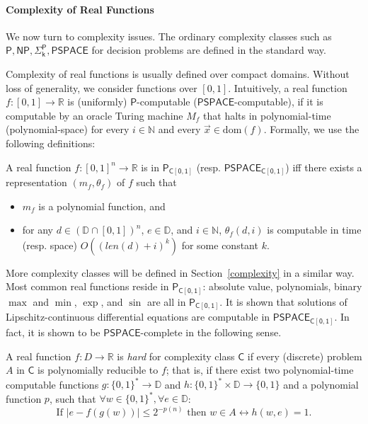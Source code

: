 \documentclass[prodmode]{acmsmall} %
\newcommand{\dom}{\mathrm{dom}}
\begin{document}
\paragraph{Complexity of Real Functions} We now turn to complexity issues. The ordinary complexity classes such as $\mathsf{P, NP, \Sigma_k^P, PSPACE}$ for decision problems are defined in the standard way. 

Complexity of real functions is usually defined over compact domains. Without loss of generality, we consider functions over $[0,1]$. Intuitively, a real function $f:[0,1]\rightarrow\mathbb{R}$ is (uniformly) $\mathsf{P}$-computable ($\mathsf{PSPACE}$-computable), if it is computable by an oracle Turing machine $M_{f}$ that halts in polynomial-time (polynomial-space) for every $i\in \mathbb{N}$ and every $\vec x\in \dom(f)$. Formally, we use the following definitions:
\begin{definition}
A real function $f: [0,1]^n\rightarrow \mathbb{R}$ is in $\mathsf{P_{C[0,1]}}$ (resp. $\mathsf{PSPACE_{C[0,1]}}$) iff there exists a representation $(m_f, \theta_f)$ of $f$ such that
\begin{itemize}
\item $m_f$ is a polynomial function, and 
\item for any $d\in (\mathbb{D}\cap [0,1])^n$, $e\in \mathbb{D}$, and $i\in \mathbb{N}$, $\theta_f(d,i)$ is computable in time (resp. space) $O((\mathit{len}(d)+i)^k)$ for some constant $k$.
\end{itemize}
\end{definition}
More complexity classes will be defined in Section~\ref{complexity} in a similar way. Most common real functions reside in $\mathsf{P_{C[0,1]}}$: absolute value, polynomials, binary $\max$ and $\min$, $\exp$, and $\sin$ are all in $\mathsf{P_{C[0,1]}}$. It is shown that solutions of Lipschitz-continuous differential equations are computable in $\mathsf{PSPACE_{C[0,1]}}$. In fact, it is shown to be $\mathsf{PSPACE}$-complete in the following sense. 
\begin{definition}
A real function $f: D\rightarrow \mathbb{R}$ is {\em hard} for complexity class $\mathsf{C}$ if every (discrete) problem $A$ in $\mathsf{C}$ is polynomially reducible to $f$; that is, if there exist two polynomial-time computable functions $g:\{0,1\}^*\rightarrow \mathbb{D}$ and $h:\{0,1\}^*\times \mathbb{D}\rightarrow \{0,1\}$ and a polynomial function $p$, such that $\forall w\in \{0,1\}^*,\forall e\in \mathbb{D}$:
$$\mbox{If }|e-f(g(w))|\leq 2^{-p(n)} \mbox{ then } w\in A\leftrightarrow h(w,e)=1.$$
\end{definition}
\end{document}
